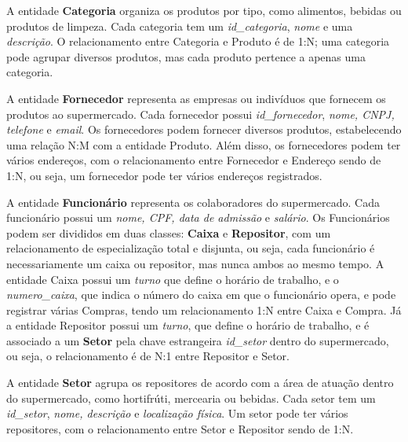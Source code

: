 \documentclass{article}
\begin{document}
\begin{flushleft}
A entidade \textbf{Categoria} organiza os produtos por tipo, como alimentos, bebidas ou produtos de limpeza. Cada categoria tem um \textit{id\_categoria}, \textit{nome} e uma \textit{descrição}. O relacionamento entre Categoria e Produto é de 1:N; uma categoria pode agrupar diversos produtos, mas cada produto pertence a apenas uma categoria.

A entidade \textbf{Fornecedor} representa as empresas ou indivíduos que fornecem os produtos ao supermercado. Cada fornecedor possui \textit{id\_fornecedor}, \textit{nome, CNPJ, telefone} e \textit{email}. Os fornecedores podem fornecer diversos produtos, estabelecendo uma relação N:M com a entidade Produto. Além disso, os fornecedores podem ter vários endereços, com o relacionamento entre Fornecedor e Endereço sendo de 1:N, ou seja, um fornecedor pode ter vários endereços registrados.

A entidade \textbf{Funcionário} representa os colaboradores do supermercado. Cada funcionário possui um \textit{nome, CPF, data de admissão} e \textit{salário}. Os Funcionários podem ser divididos em duas classes: \textbf{Caixa} e \textbf{Repositor}, com um relacionamento de especialização total e disjunta, ou seja, cada funcionário é necessariamente um caixa ou repositor, mas nunca ambos ao mesmo tempo. A entidade Caixa possui um \textit{turno} que define o horário de trabalho, e o \textit{numero\_caixa}, que indica o número do caixa em que o funcionário opera, e pode registrar várias Compras, tendo um relacionamento 1:N entre Caixa e Compra. Já a entidade Repositor possui um \textit{turno}, que define o horário de trabalho, e é associado a um \textbf{Setor} pela chave estrangeira \textit{id\_setor} dentro do supermercado, ou seja, o relacionamento é de N:1 entre Repositor e Setor.

A entidade \textbf{Setor} agrupa os repositores de acordo com a área de atuação dentro do supermercado, como hortifrúti, mercearia ou bebidas. Cada setor tem um \textit{id\_setor}, \textit{nome, descrição} e \textit{localização física}. Um setor pode ter vários repositores, com o relacionamento entre Setor e Repositor sendo de 1:N.

\end{flushleft}
\end{document}
